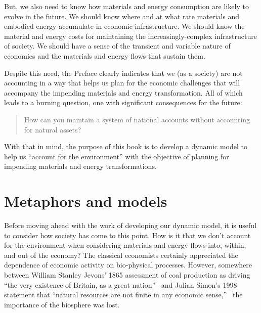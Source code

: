 But, we also need to know how materials and energy consumption 
are likely to evolve in the future.
We should know where and at what rate 
materials and embodied energy accumulate 
in economic infrastructure. 
We should know the material and energy costs for maintaining the
increasingly-complex infrastructure of society.
We should have a sense of the transient and variable nature of economies
and the materials and energy flows that sustain them.

Despite this need,
the Preface clearly indicates that we (as a society) 
are not accounting in a way that helps us plan 
for the economic challenges that will accompany 
the impending materials and energy transformation.
All of which leads to a burning question,
one with significant consequences for the future:

\begin{quote}
{\normalsize How can you maintain a system of national accounts without accounting for natural assets?}
\end{quote}

\noindent{}With that in mind, the purpose of this book is to 
develop a dynamic model to help us
``account for the environment''
with the objective of planning for impending materials and energy transformations.

\section{Metaphors and models}
\label{sec:metaphors_and_models}

Before moving ahead with the work of developing our dynamic model,
it is useful to consider how society has come to this point.
How is it that we don't account for the environment when 
considering materials and energy flows into, within, and out of the economy?
The classical economists certainly appreciated the dependence of
economic activity on bio-physical processes.\cite{Cleveland1987, Hall2011, Dale2012}
However, somewhere between William Stanley Jevons' 1865
assessment of 
coal production as driving ``the very existence of Britain, as a great nation''~\cite[IV.3]{Jevons1865}
and Julian Simon's 1998 statement that
``natural resources are not finite in any economic sense,''~\cite[p.~54]{Simon1998} %
the importance of the biosphere was lost.


